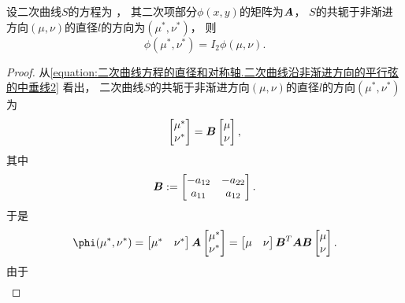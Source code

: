 \begin{proposition}\label{theorem:二次曲线方程的直径和对称轴.直径方向}
设二次曲线\(S\)的方程为 ，
其二次项部分\(\phi(x,y)\)的矩阵为\(\boldsymbol{A}\)，
\(S\)的共轭于非渐进方向\((\mu,\nu)\)的直径\(l\)的方向为\((\mu^*,\nu^*)\)，
则\begin{equation*}
	\phi(\mu^*,\nu^*) = I_2 \phi(\mu,\nu).
\end{equation*}
\begin{proof}
从\cref{equation:二次曲线方程的直径和对称轴.二次曲线沿非渐进方向的平行弦的中垂线2} 看出，
二次曲线\(S\)的共轭于非渐进方向\((\mu,\nu)\)的直径\(l\)的方向\((\mu^*,\nu^*)\)为\begin{equation*}
	\begin{bmatrix}
		\mu^* \\ \nu^*
	\end{bmatrix}
	= \boldsymbol{B}
	\begin{bmatrix}
		\mu \\ \nu
	\end{bmatrix},
\end{equation*}
其中\begin{equation*}
	\boldsymbol{B} := \begin{bmatrix}
		-a_{12} & -a_{22} \\
		a_{11} & a_{12}
	\end{bmatrix}.
\end{equation*}
于是\begin{gather*}
	\phi(\mu^*,\nu^*)
	= \begin{bmatrix}
		\mu^* & \nu^*
	\end{bmatrix}
	\vb{A}
	\begin{bmatrix}
		\mu^* \\ \nu^*
	\end{bmatrix}
	= \begin{bmatrix}
		\mu & \nu
	\end{bmatrix}
	\vb{B}^T
	\vb{A}
	\vb{B}
	\begin{bmatrix}
		\mu \\ \nu
	\end{bmatrix}.
\end{gather*}
由于\begin{align*}

\end{align*}
\end{proof}
\end{proposition}
